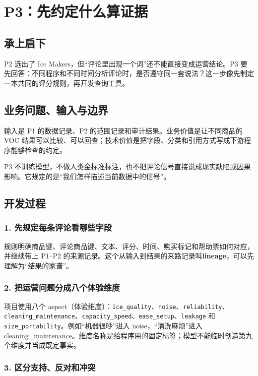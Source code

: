 \chapter{P3：先约定什么算证据}

\section{承上启下}

P2 选出了 Ice Makers，但“评论里出现一个词”还不能直接变成运营结论。P3 要先回答：不同程序和不同时间分析评论时，是否遵守同一套说法？这一步像先制定一本共同的评分规则，再开发查询工具。

\section{业务问题、输入与边界}

输入是 P1 的数据记录、P2 的范围记录和审计结果。业务价值是让不同商品的 VOC 结果可以比较、可以回查；技术价值是把字段、分类和引用方式写成下游程序能够检查的约定。

P3 不训练模型，不做人类金标准标注，也不把评论信号直接说成现实缺陷或因果影响。它规定的是“我们怎样描述当前数据中的信号”。

\section{开发过程}

\subsection{1. 先规定每条评论看哪些字段}

规则明确商品键、评论商品键、文本、评分、时间、购买标记和帮助票如何对应，并继续带上 P1--P2 的来源记录。这个从输入到结果的来路记录叫\textbf{lineage}，可以先理解为“结果的家谱”。

\subsection{2. 把运营问题分成八个体验维度}

项目使用八个 aspect（体验维度）：\texttt{ice\_quality}、\texttt{noise}、\texttt{reliability}、\texttt{cleaning\_maintenance}、\texttt{capacity\_speed}、\texttt{ease\_setup}、\texttt{leakage} 和 \texttt{size\_portability}。例如“机器很吵”进入 noise，“清洗麻烦”进入 cleaning\_maintenance。维度名称是给程序用的固定标签；模型不能临时创造第九个维度并当成既定事实。

\subsection{3. 区分支持、反对和冲突}

